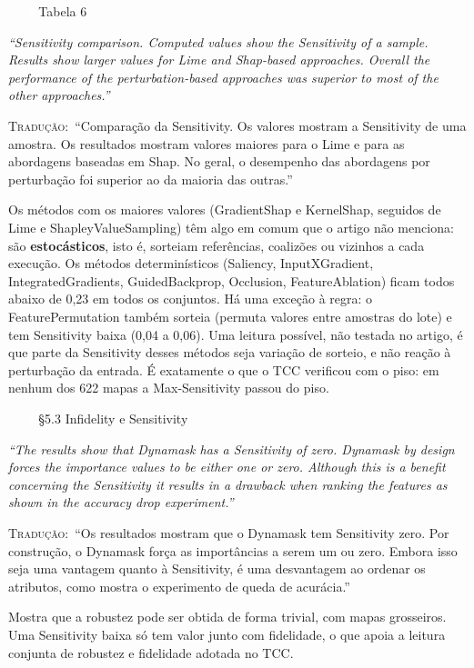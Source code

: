 \documentclass[11pt,a4paper]{article}
\newcommand{\pagechip}[1]{{\setlength{\fboxsep}{1.5pt}\colorbox{cAcc}{\textcolor{white}{\scriptsize\texttt{#1}}}}}
\newenvironment{origquote}{\par\itshape\small}{\par}
\newenvironment{tradquote}{\par\small\textsc{Tradução:}\ }{\par}
\newcommand{\explab}[1]{\par\smallskip{\small\color{cAcc}\textbf{\MakeUppercase{#1}}}\par}
\begin{document}
\begin{citacard}{\pagechip{p. 6} Tabela 6}
\begin{origquote}“Sensitivity comparison. Computed values show the Sensitivity of a sample. Results show larger values for Lime and Shap-based approaches. Overall the performance of the perturbation-based approaches was superior to most of the other approaches.”\end{origquote}
\begin{tradquote}“Comparação da Sensitivity. Os valores mostram a Sensitivity de uma amostra. Os resultados mostram valores maiores para o Lime e para as abordagens baseadas em Shap. No geral, o desempenho das abordagens por perturbação foi superior ao da maioria das outras.”\end{tradquote}
\explab{Explicação}
Os métodos com os maiores valores (GradientShap e KernelShap, seguidos de Lime e ShapleyValueSampling) têm algo em comum que o artigo não menciona: são \textbf{estocásticos}, isto é, sorteiam referências, coalizões ou vizinhos a cada execução. Os métodos determinísticos (Saliency, InputXGradient, IntegratedGradients, GuidedBackprop, Occlusion, FeatureAblation) ficam todos abaixo de 0,23 em todos os conjuntos. Há uma exceção à regra: o FeaturePermutation também sorteia (permuta valores entre amostras do lote) e tem Sensitivity baixa (0,04 a 0,06). Uma leitura possível, não testada no artigo, é que parte da Sensitivity desses métodos seja variação de sorteio, e não reação à perturbação da entrada. É exatamente o que o TCC verificou com o piso: em nenhum dos 622 mapas a Max-Sensitivity passou do piso.
\end{citacard}

\begin{citacard}{\pagechip{p. 6} §5.3 Infidelity e Sensitivity}
\begin{origquote}“The results show that Dynamask has a Sensitivity of zero. Dynamask by design forces the importance values to be either one or zero. Although this is a benefit concerning the Sensitivity it results in a drawback when ranking the features as shown in the accuracy drop experiment.”\end{origquote}
\begin{tradquote}“Os resultados mostram que o Dynamask tem Sensitivity zero. Por construção, o Dynamask força as importâncias a serem um ou zero. Embora isso seja uma vantagem quanto à Sensitivity, é uma desvantagem ao ordenar os atributos, como mostra o experimento de queda de acurácia.”\end{tradquote}
\explab{Explicação}
Mostra que a robustez pode ser obtida de forma trivial, com mapas grosseiros. Uma Sensitivity baixa só tem valor junto com fidelidade, o que apoia a leitura conjunta de robustez e fidelidade adotada no TCC.
\end{citacard}
\end{document}
